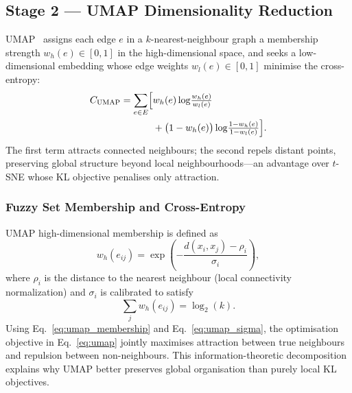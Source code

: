 \documentclass[10pt,twocolumn,a4paper]{article}
\begin{document}
\subsection{Stage 2 --- UMAP Dimensionality Reduction}
\label{sec:umap}

UMAP~\cite{mcinnes2018} assigns each edge $e$ in a $k$-nearest-neighbour graph a membership strength $w_h(e) \in [0,1]$ in the high-dimensional space, and seeks a low-dimensional embedding whose edge weights $w_l(e) \in [0,1]$ minimise the cross-entropy:
\begin{equation}
\label{eq:umap}
\begin{aligned}
C_{\text{UMAP}} = \sum_{e \in E}\Bigl[ & w_h(e)\log\!\tfrac{w_h(e)}{w_l(e)} \\
 & + \bigl(1 - w_h(e)\bigr)\log\!\tfrac{1 - w_h(e)}{1 - w_l(e)}\Bigr].
\end{aligned}
\end{equation}
The first term attracts connected neighbours; the second repels distant points, preserving global structure beyond local neighbourhoods---an advantage over $t$-SNE whose KL objective penalises only attraction.

\subsubsection{Fuzzy Set Membership and Cross-Entropy}
\label{sec:umap_fuzzy}

UMAP high-dimensional membership is defined as
\begin{equation}
\label{eq:umap_membership}
w_h(e_{ij}) = \exp\!\left(-\frac{d(x_i,x_j)-\rho_i}{\sigma_i}\right),
\end{equation}
where $\rho_i$ is the distance to the nearest neighbour (local connectivity normalization) and $\sigma_i$ is calibrated to satisfy
\begin{equation}
\label{eq:umap_sigma}
\sum_j w_h(e_{ij}) = \log_2(k).
\end{equation}
Using Eq.~\eqref{eq:umap_membership} and Eq.~\eqref{eq:umap_sigma}, the optimisation objective in Eq.~\eqref{eq:umap} jointly maximises attraction between true neighbours and repulsion between non-neighbours. This information-theoretic decomposition explains why UMAP better preserves global organisation than purely local KL objectives.
\end{document}
